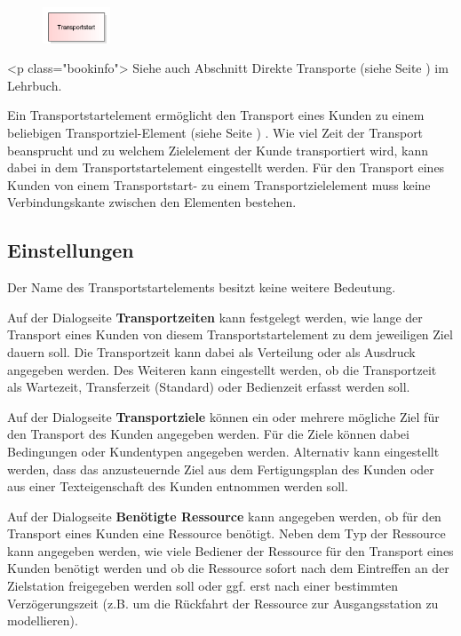 \begin{figure}
\vspace{-22pt}
\includegraphics[width=2cm]{imageModelElementTransportSource.png}
\vspace{-22pt}
\end{figure}

<p class="bookinfo">
Siehe auch Abschnitt Direkte Transporte (siehe Seite \pageref{ref:book:8.3.1}) im Lehrbuch.

Ein Transportstartelement ermöglicht den Transport eines Kunden zu einem beliebigen
Transportziel-Element (siehe Seite \pageref{ref:ModelElementTransportDestination}) . Wie viel
Zeit der Transport beansprucht und zu welchem Zielelement der Kunde transportiert
wird, kann dabei in dem Transportstartelement eingestellt werden.
Für den Transport eines Kunden von einem Transportstart- zu einem Transportzielelement
muss keine Verbindungskante zwischen den Elementen bestehen.

\subsection*{Einstellungen}

Der Name des Transportstartelements besitzt keine weitere Bedeutung.

Auf der Dialogseite \textbf{Transportzeiten} kann festgelegt werden, wie lange der Transport
eines Kunden von diesem Transportstartelement zu dem jeweiligen Ziel dauern soll. Die Transportzeit
kann dabei als Verteilung oder als Ausdruck angegeben werden. Des Weiteren kann eingestellt
werden, ob die Transportzeit als Wartezeit, Transferzeit (Standard) oder Bedienzeit
erfasst werden soll.

Auf der Dialogseite \textbf{Transportziele} können ein oder mehrere
mögliche Ziel für den Transport des Kunden angegeben werden. Für die Ziele können dabei
Bedingungen oder Kundentypen angegeben werden. Alternativ kann eingestellt werden, dass
das anzusteuernde Ziel aus dem Fertigungsplan des Kunden oder aus einer Texteigenschaft
des Kunden entnommen werden soll.

Auf der Dialogseite \textbf{Benötigte Ressource} kann angegeben werden, ob
für den Transport eines Kunden eine Ressource benötigt. Neben dem Typ der
Ressource kann angegeben werden, wie viele Bediener der Ressource für den
Transport eines Kunden benötigt werden und ob die Ressource sofort nach dem
Eintreffen an der Zielstation freigegeben werden soll oder ggf. erst nach
einer bestimmten Verzögerungszeit (z.B. um die Rückfahrt der Ressource
zur Ausgangsstation zu modellieren).

